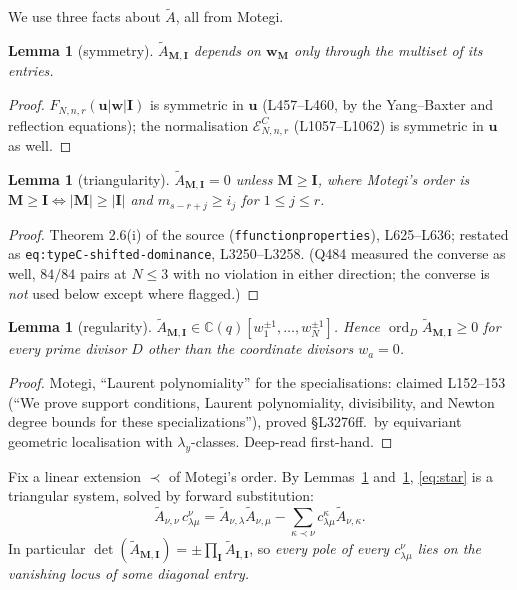 \documentclass[11pt]{article}
\theoremstyle{plain}
\newtheorem{lem}[thm]{Lemma}
\theoremstyle{definition}
\theoremstyle{remark}
\theoremstyle{plain}
\newcommand{\bI}{\mathbf{I}}
\newcommand{\bM}{\mathbf{M}}
\newcommand{\bu}{\mathbf{u}}
\newcommand{\bw}{\mathbf{w}}
\newcommand{\At}{\widetilde{A}}
\newcommand{\ord}{\operatorname{ord}}
\begin{document}
We use three facts about $\At$, all from Motegi.

\begin{lem}[symmetry]\label{lem:sym}
$\At_{\bM,\bI}$ depends on $\bw_{\bM}$ only through the multiset of its
entries.
\end{lem}
\begin{proof}
$F_{N,n,r}(\bu|\bw|\bI)$ is symmetric in $\bu$ (L457--L460, by the Yang--Baxter
and reflection equations); the normalisation
$\mathcal{E}^C_{N,n,r}$ (L1057--L1062) is symmetric in $\bu$ as well.
\end{proof}

\begin{lem}[triangularity]\label{lem:tri}
$\At_{\bM,\bI}=0$ unless $\bM\ge\bI$, where Motegi's order is
$\bM\ge\bI\iff|\bM|\ge|\bI|$ and $m_{s-r+j}\ge i_j$ for $1\le j\le r$.
\end{lem}
\begin{proof}
Theorem 2.6(i) of the source (\texttt{ffunctionproperties}), L625--L636; restated as
\texttt{eq:typeC-shifted-dominance}, L3250--L3258.  (Q484 measured the converse
as well, $84/84$ pairs at $N\le3$ with no violation in either direction; the
converse is \emph{not} used below except where flagged.)
\end{proof}

\begin{lem}[regularity]\label{lem:reg}
$\At_{\bM,\bI}\in\mathbb{C}(q)[w_1^{\pm1},\dots,w_N^{\pm1}]$.  Hence
$\ord_D\At_{\bM,\bI}\ge0$ for every prime divisor $D$ other than the coordinate
divisors $w_a=0$.
\end{lem}
\begin{proof}
Motegi, ``Laurent polynomiality'' for the specialisations: claimed L152--153
(``We prove support conditions, Laurent polynomiality, divisibility, and Newton
degree bounds for these specializations''), proved \S L3276ff.\ by equivariant
geometric localisation with $\lambda_y$-classes.  Deep-read first-hand.
\end{proof}

Fix a linear extension $\prec$ of Motegi's order.  By Lemmas~\ref{lem:tri}
and~\ref{lem:reg}, \eqref{eq:star} is a triangular system, solved by forward
substitution:
\begin{equation}
\At_{\nu,\nu}\,c^{\nu}_{\lambda\mu}
=\At_{\nu,\lambda}\At_{\nu,\mu}
-\sum_{\kappa\prec\nu}c^{\kappa}_{\lambda\mu}\At_{\nu,\kappa}.
\label{eq:rec}
\end{equation}
In particular $\det(\At_{\bM,\bI})=\pm\prod_{\bI}\At_{\bI,\bI}$, so
\emph{every pole of every $c^{\nu}_{\lambda\mu}$ lies on the vanishing locus of
some diagonal entry.}
\end{document}
